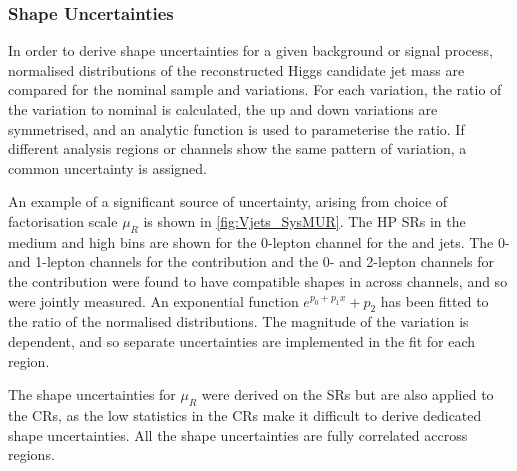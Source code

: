 

\subsubsection{Shape Uncertainties}\label{sec:shape_uncertainties}

In order to derive shape uncertainties for a given background or signal process, normalised distributions of the reconstructed \largeR Higgs candidate jet mass \mJ are compared for the nominal sample and variations.
For each variation, the ratio of the variation to nominal is calculated, the up and down variations are symmetrised, and an analytic function is used to parameterise the ratio.
If different analysis regions or channels show the same pattern of variation, a common uncertainty is assigned.

An example of a significant source of uncertainty, arising from choice of factorisation scale $\mu_R$ is shown in \cref{fig:Vjets_SysMUR}.
The HP SRs in the medium and high \pTV bins are shown for the 0-lepton channel for the \Whf and \Zhf jets.
The 0- and 1-lepton channels for the \Whf contribution and the 0- and 2-lepton channels for the \Zjets contribution were found to have compatible shapes in \mJ across channels, and so were jointly measured.
An exponential function $e^{p_0+p_1x}+p_2$ has been fitted to the ratio of the normalised distributions.
The magnitude of the variation is \ptv dependent, and so separate uncertainties are implemented in the fit for each \pTV region. 

The shape uncertainties for $\mu_R$ were derived on the SRs but are also applied to the CRs, as the low statistics in the CRs make it difficult to derive dedicated shape uncertainties.
All the shape uncertainties are fully correlated accross regions.

